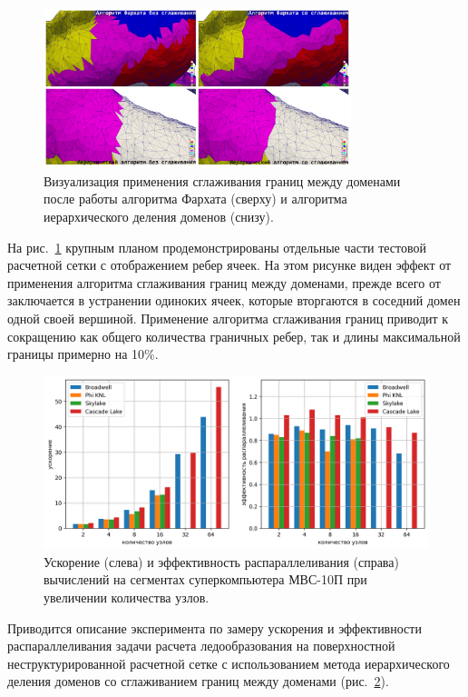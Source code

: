 \documentclass[a4paper,14pt]{extarticle}                     %
\theoremstyle{plain}                                         %
\begin{document}
\begin{figure}[!ht]
\centering
\includegraphics[width=0.8\textwidth]{./pics/text_2_smooth/decomp2.pdf}
\singlespacing
\caption{Визуализация применения сглаживания границ между доменами после работы алгоритма Фархата (сверху) и алгоритма иерархического деления доменов (снизу).}
\label{fig:text_2_smooth_decomp2}
\end{figure}

На рис.~\ref{fig:text_2_smooth_decomp2} крупным планом продемонстрированы отдельные части тестовой расчетной сетки с отображением ребер ячеек.
На этом рисунке виден эффект от применения алгоритма сглаживания границ между доменами, прежде всего от заключается в устранении одиноких ячеек, которые вторгаются в соседний домен одной своей вершиной.
Применение алгоритма сглаживания границ приводит к сокращению как общего количества граничных ребер, так и длины максимальной границы примерно на 10\%.

\begin{figure}[!ht]
\centering
\includegraphics[width=1.0\textwidth]{pics/text_2_scaling/2in1.png}
\singlespacing
\caption{Ускорение (слева) и эффективность распараллеливания (справа) вычислений на сегментах суперкомпьютера МВС-10П при увеличении количества узлов.}
\label{fig:text_2_scaling_speedup_eff}
\end{figure}

Приводится описание эксперимента по замеру ускорения и эффективности распараллеливания задачи расчета ледообразования на поверхностной неструктурированной расчетной сетке с использованием метода иерархического деления доменов со сглаживанием границ между доменами (рис.~\ref{fig:text_2_scaling_speedup_eff}).
\end{document}
